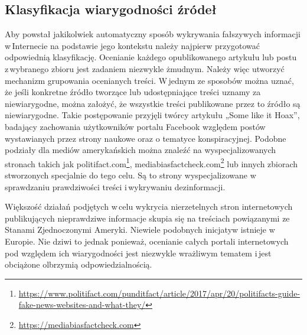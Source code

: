 
\subsection{Klasyfikacja wiarygodności źródeł}
Aby powstał jakikolwiek automatyczny sposób wykrywania fałszywych informacji w\,Internecie na podstawie jego kontekstu należy najpierw przygotować odpowiednią klasyfikację. Ocenianie każdego opublikowanego artykułu lub postu z\,wybranego zbioru jest zadaniem niezwykle żmudnym. Należy więc utworzyć mechanizm grupowania ocenianych treści. W\,jednym ze sposobów można uznać, że jeśli konkretne źródło tworzące lub udostępniające treści uznamy za niewiarygodne, można założyć, że wszystkie treści publikowane przez to źródło są niewiarygodne. Takie postępowanie przyjęli twórcy artykułu „Some like it Hoax”\cite{tacchini2017some}, badający zachowania użytkowników portalu Facebook względem postów wystawianych przez strony naukowe oraz o tematyce konspiracyjnej. Podobne podziały dla mediów amerykańskich można znaleźć na wyspecjalizowanych stronach takich jak politifact.com\footnote{\url{https://www.politifact.com/punditfact/article/2017/apr/20/politifacts-guide-fake-news-websites-and-what-they/}},  mediabiasfactcheck.com\footnote{\url{https://mediabiasfactcheck.com}}  lub innych zbiorach stworzonych specjalnie do tego celu. Są to strony wyspecjalizowane w\,sprawdzaniu prawdziwości treści i\,wykrywaniu dezinformacji. 
\par
Większość działań podjętych w\,celu wykrycia nierzetelnych stron internetowych publikujących nieprawdziwe informacje skupia się na treściach powiązanymi ze Stanami Zjednoczonymi Ameryki. Niewiele podobnych inicjatyw istnieje w\,Europie. Nie dziwi to jednak ponieważ, ocenianie całych portali internetowych pod względem ich wiarygodności jest niezwykle wrażliwym tematem i\,jest obciążone olbrzymią odpowiedzialnością. 
